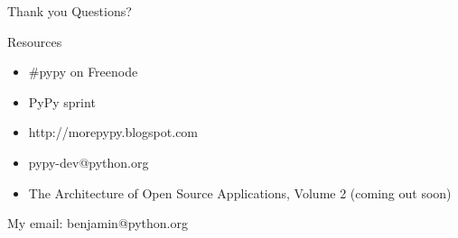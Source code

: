 \documentclass[14pt]{beamer}
\begin{document}
\begin{frame}[fragile]{Thank you}
Questions?

Resources
\begin{itemize}
\item \#pypy on Freenode
\item PyPy sprint
\item http://morepypy.blogspot.com
\item pypy-dev@python.org
\item The Architecture of Open Source Applications, Volume 2 (coming out soon)
\end{itemize}


My email: benjamin@python.org
\end{frame}
\end{document}
